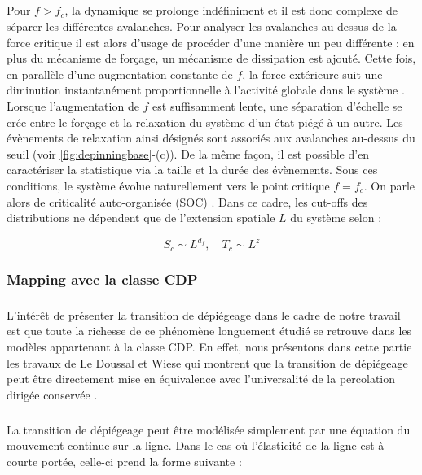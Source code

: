 \subparagraph{}Pour $f>f_c$, la dynamique se prolonge indéfiniment et il est donc complexe de séparer les différentes avalanches. Pour analyser les avalanches au-dessus de la force critique il est alors d'usage de procéder d'une manière un peu différente : en plus du mécanisme de forçage, un mécanisme de dissipation est ajouté. Cette fois, en parallèle d'une augmentation constante de $f$, la force extérieure suit une diminution instantanément proportionnelle à l'activité globale dans le système \cite{le_priol_long_range_2020, wiese_theory_2022}. Lorsque l'augmentation de $f$ est suffisamment lente, une séparation d'échelle se crée entre le forçage et la relaxation du système d'un état piégé à un autre. Les évènements de relaxation ainsi désignés sont associés aux avalanches au-dessus du seuil (voir \autoref{fig:depinningbase}-(c)). De la même façon, il est possible d'en caractériser la statistique via la taille et la durée des évènements. Sous ces conditions, le système évolue naturellement vers le point critique $f=f_c$. On parle alors de criticalité auto-organisée (SOC) \cite{bak_self_organized_1988, turcotte_self_organized_1999, lubeck_universal_2004}. Dans ce cadre, les cut-offs des distributions ne dépendent que de l'extension spatiale $L$ du système selon :

\begin{equation}
	S_c \sim L^{d_f}, \quad T_c \sim L^{z}
\end{equation}

\subsubsection{Mapping avec la classe CDP}

\label{sec:mapping_dep_cdp}

\subparagraph{}L'intérêt de présenter la transition de dépiégeage dans le cadre de notre travail est que toute la richesse de ce phénomène longuement étudié se retrouve dans les modèles appartenant à la classe CDP. En effet, nous présentons dans cette partie les travaux de Le Doussal et Wiese qui montrent que la transition de dépiégeage peut être directement mise en équivalence avec l'universalité de la percolation dirigée conservée \cite{le_doussal_exact_2015, wiese_hyperuniformity_2024}.

\subparagraph{}La transition de dépiégeage peut être modélisée simplement par une équation du mouvement continue sur la ligne. Dans le cas où l'élasticité de la ligne est à courte portée, celle-ci prend la forme suivante \cite{fisher_collective_1998, wiese_theory_2022} :

